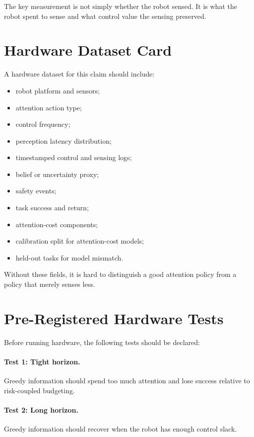 \documentclass{article}
\begin{document}
The key measurement is not simply whether the robot sensed. It is what the
robot spent to sense and what control value the sensing preserved.

\section{Hardware Dataset Card}

A hardware dataset for this claim should include:

\begin{itemize}
    \item robot platform and sensors;
    \item attention action type;
    \item control frequency;
    \item perception latency distribution;
    \item timestamped control and sensing logs;
    \item belief or uncertainty proxy;
    \item safety events;
    \item task success and return;
    \item attention-cost components;
    \item calibration split for attention-cost models;
    \item held-out tasks for model mismatch.
\end{itemize}

Without these fields, it is hard to distinguish a good attention policy from a
policy that merely senses less.

\section{Pre-Registered Hardware Tests}

Before running hardware, the following tests should be declared:

\paragraph{Test 1: Tight horizon.}
Greedy information should spend too much attention and lose success relative to
risk-coupled budgeting.

\paragraph{Test 2: Long horizon.}
Greedy information should recover when the robot has enough control slack.
\end{document}
